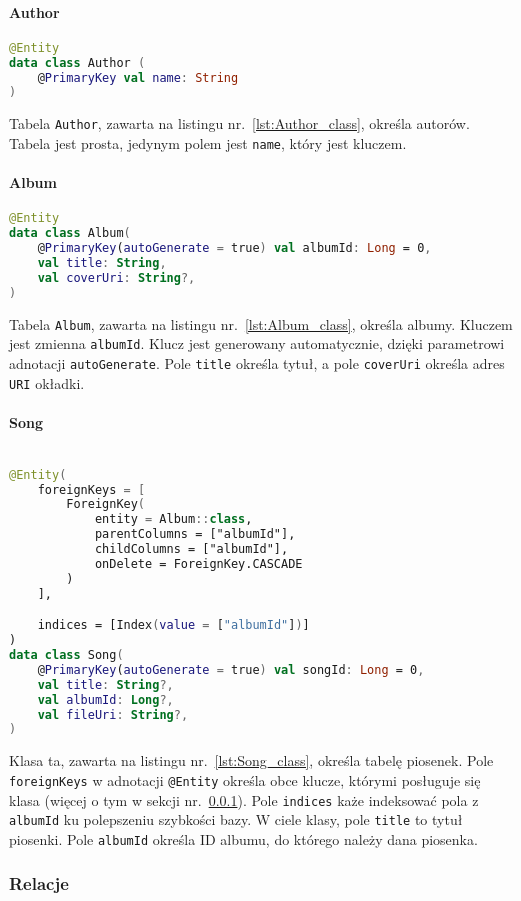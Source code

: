 \paragraph{Author}

\begin{lstlisting}[caption=Deklaracja tabeli Author, label={lst:Author_class}, language=kotlin]
@Entity
data class Author (
    @PrimaryKey val name: String
)
\end{lstlisting}

Tabela \texttt{Author}, zawarta na listingu nr.~\ref{lst:Author_class}, określa autorów. Tabela jest prosta, jedynym polem jest \texttt{name}, który jest kluczem.

\paragraph{Album}

\begin{lstlisting}[caption=Deklaracja tabeli Album, label={lst:Album_class}, language=kotlin]
@Entity
data class Album(
    @PrimaryKey(autoGenerate = true) val albumId: Long = 0,
    val title: String,
    val coverUri: String?,
)
\end{lstlisting}

Tabela \texttt{Album}, zawarta na listingu nr.~\ref{lst:Album_class}, określa albumy. Kluczem jest zmienna \texttt{albumId}. Klucz jest generowany automatycznie, dzięki parametrowi adnotacji \texttt{autoGenerate}. Pole \texttt{title} określa tytuł, a pole \texttt{coverUri} określa adres \texttt{URI} okładki.

\paragraph{Song}

\begin{lstlisting}[caption=Deklaracja tabeli Song, label={lst:Song_class}, language=kotlin]

@Entity(
    foreignKeys = [
        ForeignKey(
            entity = Album::class,
            parentColumns = ["albumId"],
            childColumns = ["albumId"],
            onDelete = ForeignKey.CASCADE
        )
    ],

    indices = [Index(value = ["albumId"])]
)
data class Song(
    @PrimaryKey(autoGenerate = true) val songId: Long = 0,
    val title: String?,
    val albumId: Long?,
    val fileUri: String?,
)

\end{lstlisting}

Klasa ta, zawarta na listingu nr.~\ref{lst:Song_class}, określa tabelę piosenek. Pole \texttt{foreignKeys} w adnotacji \texttt{@Entity} określa obce klucze, którymi posługuje się klasa (więcej o tym w sekcji nr.~\ref{sec:relations}). Pole \texttt{indices} każe indeksować pola z \texttt{albumId} ku polepszeniu szybkości bazy. W ciele klasy, pole \texttt{title} to tytuł piosenki. Pole \texttt{albumId} określa ID albumu, do którego należy dana piosenka. 

\subsubsection{Relacje} \label{sec:relations}
